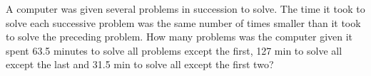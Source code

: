 
%
%
%
%
% 
% 

\question A computer was given several problems in succession to solve. The time it took 
to solve each successive problem was the same number of times smaller than it took
to solve the preceding problem. How many problems was the computer given  it 
spent 63.5 minutes to solve all problems except the first, 127 min to solve all except
the last and 31.5 min to solve all except the first two?

\insertQR{}

\ifprintanswers
\fi 

